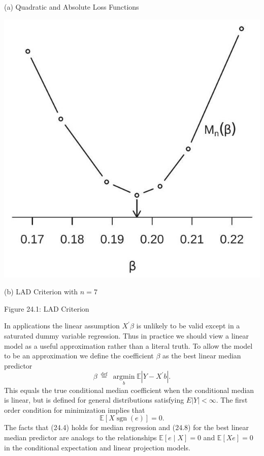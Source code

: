 \documentclass[10pt]{article}
\begin{document}
(a) Quadratic and Absolute Loss Functions

\includegraphics[max width=\textwidth]{2022_10_23_47027c652ef567187a65g-03(1)}

(b) LAD Criterion with $n=7$

Figure 24.1: LAD Criterion

In applications the linear assumption $X^{\prime} \beta$ is unlikely to be valid except in a saturated dummy variable regression. Thus in practice we should view a linear model as a useful approximation rather than a literal truth. To allow the model to be an approximation we define the coefficient $\beta$ as the best linear median predictor
$$
\beta \stackrel{\text { def }}{=} \underset{b}{\operatorname{argmin}} \mathbb{E}\left|Y-X^{\prime} b\right| .
$$
This equals the true conditional median coefficient when the conditional median is linear, but is defined for general distributions satisfying $E|Y|<\infty$. The first order condition for minimization implies that
$$
\mathbb{E}[X \operatorname{sgn}(e)]=0 .
$$
The facts that (24.4) holds for median regression and (24.8) for the best linear median predictor are analogs to the relationships $\mathbb{E}[e \mid X]=0$ and $\mathbb{E}[X e]=0$ in the conditional expectation and linear projection models.
\end{document}
